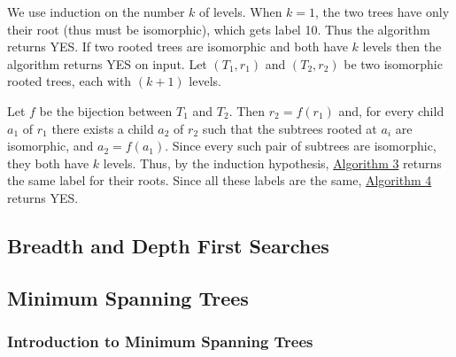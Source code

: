 \noindent{}
{We use induction on the number \(k\) of levels. When \(k=1\), the two trees have only their root (thus must be isomorphic), which gets label 10. Thus the algorithm returns YES. If two rooted trees are isomorphic and both have \(k\) levels then the algorithm returns YES on input. Let \((T_1,r_1)\) and \((T_2,r_2)\) be two isomorphic rooted trees, each with \((k+1)\) levels. 

Let \(f\) be the bijection between \(T_1\) and \(T_2\). Then \(r_2=f(r_1)\) and, for every child \(a_1\) of \(r_1\) there exists a child \(a_2\) of \(r_2\) such that the subtrees rooted at \(a_i\) are isomorphic, and \(a_2 = f(a_1)\). Since every such pair of subtrees are isomorphic, they both have \(k\) levels. Thus, by the induction hypothesis, \hyperref[alg:Label Vertex]{Algorithm 3} returns the same label for their roots. Since all these labels are the same, \hyperref[alg:Labelled Tree Isomorphism]{Algorithm 4} returns YES.}

\newpage\subsection{Breadth and Depth First Searches}

\subsection{Minimum Spanning Trees}

\subsubsection{Introduction to Minimum Spanning Trees}



